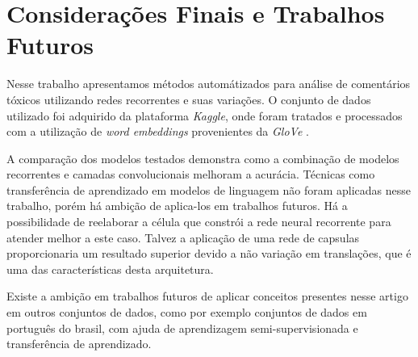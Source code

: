 \documentclass[12pt]{article}
\begin{document}
\section{Considerações Finais e Trabalhos Futuros}

Nesse trabalho apresentamos métodos automátizados para análise de comentários tóxicos utilizando redes recorrentes e suas variações. O conjunto de dados utilizado foi adquirido da plataforma \textit{Kaggle}, onde foram tratados e processados com a utilização de \textit{word embeddings} provenientes da \textit{GloVe} \cite{pennington2014glove}.

A comparação dos modelos testados demonstra como a combinação de modelos recorrentes e camadas convolucionais melhoram a acurácia. Técnicas como transferência de aprendizado em modelos de linguagem não foram aplicadas nesse trabalho, porém há ambição de aplica-los em trabalhos futuros. Há a possibilidade de reelaborar a célula que constrói a rede neural recorrente para atender melhor a este caso. Talvez a aplicação de uma rede de capsulas \cite{DBLP:journals/corr/abs-1710-09829} proporcionaria um resultado superior devido a não variação em translações, que é uma das características desta arquitetura.

Existe a ambição em trabalhos futuros de aplicar conceitos presentes nesse artigo em outros conjuntos de dados, como por exemplo conjuntos de dados em português do brasil, com ajuda de aprendizagem semi-supervisionada e transferência de aprendizado.



\end{document}
